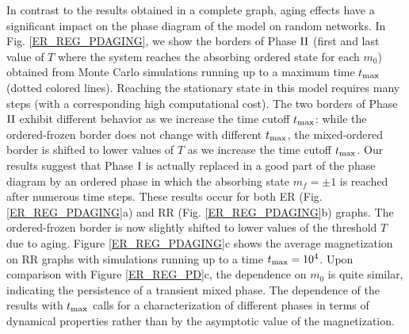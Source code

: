 In contrast to the results obtained in a complete graph, aging effects have a significant impact on the phase diagram of the model on random networks. In Fig. \ref{ER_REG_PDAGING}, we show the borders of Phase ${\rm II}$ (first and last value of $T$ where the system reaches the absorbing ordered state for each $m_0$) obtained from Monte Carlo simulations running up to a maximum time $t_{\rm max}$ (dotted colored lines). Reaching the stationary state in this model requires many steps (with a corresponding high computational cost). The two borders of Phase ${\rm II}$ exhibit different behavior as we increase the time cutoff $t_{\rm max}$: while the ordered-frozen border does not change with different $t_{\rm max}$, the mixed-ordered border is shifted to lower values of $T$ as we increase the time cutoff $t_{\rm max}$. Our results suggest that Phase ${\rm I}$ is actually replaced in a good part of the phase diagram by an ordered phase in which the absorbing state $m_f = \pm 1$ is reached after numerous time steps. These results occur for both ER (Fig. \ref{ER_REG_PDAGING}a) and RR (Fig. \ref{ER_REG_PDAGING}b) graphs. The ordered-frozen border is now slightly shifted to lower values of the threshold $T$ due to aging. Figure \ref{ER_REG_PDAGING}c shows the average magnetization on RR graphs with simulations running up to a time $t_{\rm max} = 10^4$. Upon comparison with Figure \ref{ER_REG_PD}c, the dependence on $m_0$ is quite similar, indicating the persistence of a transient mixed phase. The dependence of the results with $t_{\rm max}$ calls for a characterization of different phases in terms of dynamical properties rather than by the asymptotic value of the magnetization.


